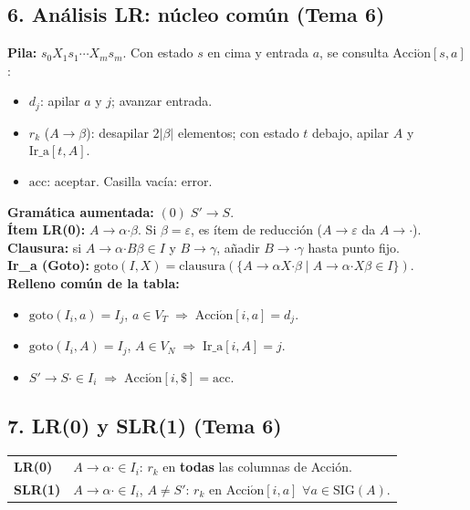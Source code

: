 \begin{landscape}
\begin{multicols*}{3}
\subsection*{6. Análisis LR: núcleo común (Tema 6)}
\textbf{Pila:} $s_0X_1s_1\cdots X_ms_m$. Con estado $s$ en cima y entrada $a$, se consulta $\mathrm{Acci\acute{o}n}[s,a]$:
\begin{itemize}
\item $d_j$: apilar $a$ y $j$; avanzar entrada.
\item $r_k$ ($A\to\beta$): desapilar $2|\beta|$ elementos; con estado $t$ debajo, apilar $A$ y $\mathrm{Ir\_a}[t,A]$.
\item $\mathrm{acc}$: aceptar. Casilla vacía: error.
\end{itemize}
\textbf{Gramática aumentada:} $(0)\; S'\to S$.\\
\textbf{Ítem LR(0):} $A\to\alpha\mathbin{\boldsymbol{\cdot}}\beta$. Si $\beta=\varepsilon$, es ítem de reducción ($A\to\varepsilon$ da $A\to\mathbin{\boldsymbol{\cdot}}$).\\
\textbf{Clausura:} si $A\to\alpha\mathbin{\boldsymbol{\cdot}} B\beta\in I$ y $B\to\gamma$, añadir $B\to\mathbin{\boldsymbol{\cdot}}\gamma$ hasta punto fijo.\\
\textbf{Ir\_a (Goto):} $\mathrm{goto}(I,X)=\mathrm{clausura}(\{A\to\alpha X\mathbin{\boldsymbol{\cdot}}\beta\mid A\to\alpha\mathbin{\boldsymbol{\cdot}} X\beta\in I\})$.\\
\textbf{Relleno común de la tabla:}
\begin{itemize}
\item $\mathrm{goto}(I_i,a)=I_j$, $a\in V_T\;\Rightarrow\;\mathrm{Acci\acute{o}n}[i,a]=d_j$.
\item $\mathrm{goto}(I_i,A)=I_j$, $A\in V_N\;\Rightarrow\;\mathrm{Ir\_a}[i,A]=j$.
\item $S'\to S\mathbin{\boldsymbol{\cdot}}\in I_i\;\Rightarrow\;\mathrm{Acci\acute{o}n}[i,\$]=\mathrm{acc}$.
\end{itemize}

\subsection*{7. LR(0) y SLR(1) (Tema 6)}
\begin{tabular}{@{}lp{7.1cm}@{}}
\toprule
\textbf{LR(0)} & $A\to\alpha\mathbin{\boldsymbol{\cdot}}\in I_i$: $r_k$ en \textbf{todas} las columnas de Acción.\\
\textbf{SLR(1)} & $A\to\alpha\mathbin{\boldsymbol{\cdot}}\in I_i$, $A\ne S'$: $r_k$ en $\mathrm{Acci\acute{o}n}[i,a]$ $\forall a\in\mathrm{SIG}(A)$.\\
\bottomrule
\end{tabular}


\end{multicols*}
\end{landscape}

